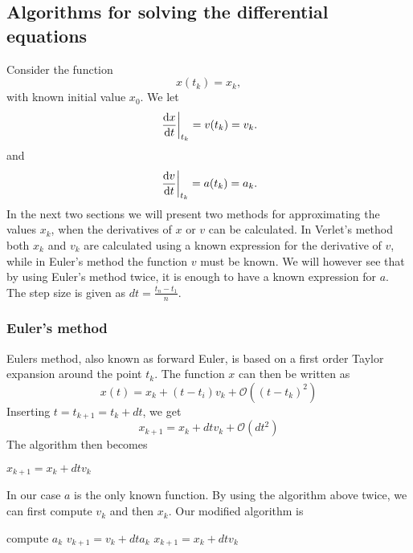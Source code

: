 \subsection{Algorithms for solving the differential equations}
Consider the function
\begin{equation}
	x(t_k)=x_k,
\end{equation}
with known initial value $x_0$. We let
\begin{equation}
\left.\dv{x}{t}\right\rvert_{t_k}=v(t_k)=v_k.
\end{equation}
and
\begin{equation}
\left.\dv{v}{t}\right\rvert_{t_k} = a(t_k)=a_k.
\end{equation}
In the next two sections we will present two methods for approximating the values $x_{k}$, when the derivatives of $x$ or $v$ can be calculated. In Verlet's method both $x_k$ and $v_k$ are calculated using a known expression for the derivative of $v$, while in Euler's method the function $v$ must be known. We will however see that by using Euler's method twice, it is enough to have a known expression for $a$. The step size is given as $dt=\frac{t_n-t_1}{n}$.
\subsubsection{Euler's method}
\label{sec:fe}
Eulers method, also known as forward Euler, is based on a first order Taylor expansion around the point $t_k$. The function $x$ can then be written as
\begin{equation}
	x(t) = x_k + (t-t_i)v_k+\mathcal{O}\left(\left( t-t_k\right) ^2\right)
\end{equation}
Inserting $t=t_{k+1} = t_k + dt$, we get
\begin{equation}
	x_{k+1}=x_k + dtv_k + \mathcal{O}\left( dt^2\right)
\end{equation}
The algorithm then becomes
\begin{algorithm}[h!]
	\SetAlgoLined
		$x_{k+1} = x_k+dtv_k$\;
\end{algorithm}

In our case $a$ is the only known function. By using the algorithm above twice, we can first compute $v_k$ and then $x_k$. Our modified algorithm is
\begin{algorithm}[h!]
	\SetAlgoLined
		compute $a_k$\;
		$v_{k+1} = v_k+dta_k$\;
		$x_{k+1} = x_k+dtv_k$\;
\end{algorithm}

